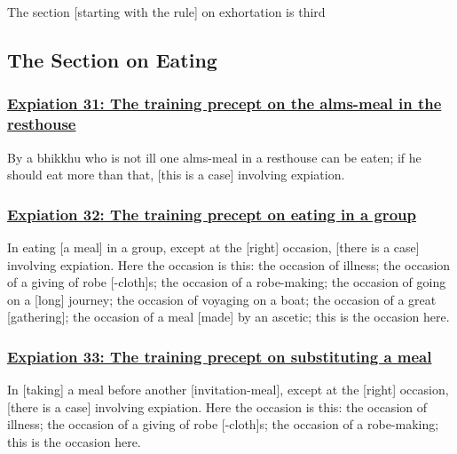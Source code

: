 \begin{center}
	The section [starting with the rule] on exhortation is third
\end{center}



\setsubsecheadstyle{\subsectionFmt}
\subsection{The Section on Eating}
\label{exp-vagga4}

\subsubsection*{\hyperref[pac31]{Expiation 31: The training precept on the alms-meal in the resthouse}}
\label{exp31}
By a bhikkhu who is not ill one alms-meal in a resthouse can be eaten; if he should eat more than that, [this is a case] involving expiation.



\subsubsection*{\hyperref[pac32]{Expiation 32: The training precept on eating in a group}}
\label{exp32}
In eating [a meal] in a group, except at the [right] occasion, [there is a case] involving expiation. Here the occasion is this: the occasion of illness; the occasion of a giving of robe [-cloth]s; the occasion of a robe-making; the occasion of going on a [long] journey; the occasion of voyaging on a boat; the occasion of a great [gathering]; the occasion of a meal [made] by an ascetic; this is the occasion here.



\subsubsection*{\hyperref[pac33]{Expiation 33: The training precept on substituting a meal}}
\label{exp33}
In [taking] a meal before another [invitation-meal], except at the [right] occasion, [there is a case] involving expiation. Here the occasion is this: the occasion of illness; the occasion of a giving of robe [-cloth]s; the occasion of a robe-making; this is the occasion here.



